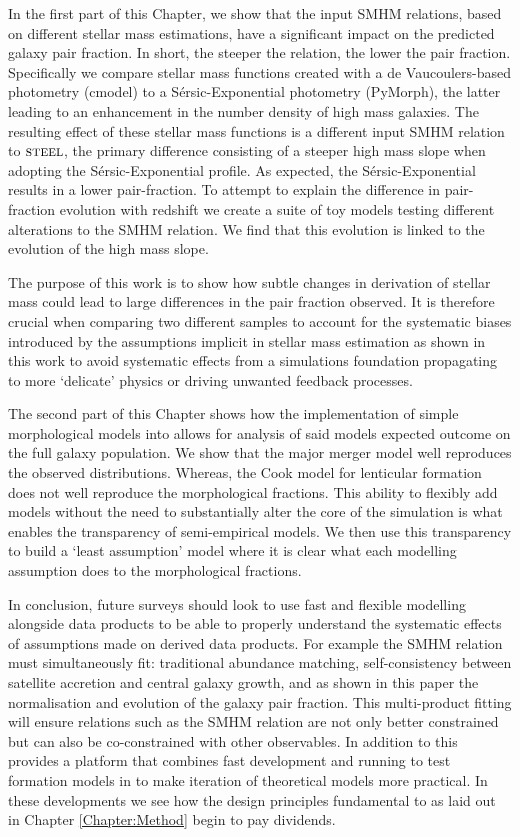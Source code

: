 In the first part of this Chapter, we show that the input SMHM relations, based on different stellar mass estimations, have a significant impact on the predicted galaxy pair fraction. In short, the steeper the relation, the lower the pair fraction. Specifically we compare stellar mass functions created with a de Vaucoulers-based photometry (cmodel) to a S\'ersic-Exponential photometry (PyMorph), the latter leading to an enhancement in the number density of high mass galaxies. The resulting effect of these stellar mass functions is a different input SMHM relation to $\textsc{steel}$, the primary difference consisting of a steeper high mass slope when adopting the S\'ersic-Exponential profile. As expected, the S\'ersic-Exponential results in a lower pair-fraction. To attempt to explain the difference in pair-fraction evolution with redshift we create a suite of toy models testing different alterations to the SMHM relation. We find that this evolution is linked to the evolution of the high mass slope.

The purpose of this work is to show how subtle changes in derivation of stellar mass could lead to large differences in the pair fraction observed. It is therefore crucial when comparing two different samples to account for the systematic biases introduced by the assumptions implicit in stellar mass estimation as shown in this work to avoid systematic effects from a simulations foundation propagating to more `delicate' physics or driving unwanted feedback processes.

The second part of this Chapter shows how the implementation of simple morphological models into \steel allows for analysis of said models expected outcome on the full galaxy population. We show that the major merger model well reproduces the observed distributions. Whereas, the Cook model for lenticular formation does not well reproduce the morphological fractions. This ability to flexibly add models without the need to substantially alter the core of the simulation is what enables the transparency of semi-empirical models. We then use this transparency to build a `least assumption' model where it is clear what each modelling assumption does to the morphological fractions.

In conclusion, future surveys should look to use fast and flexible modelling alongside data products to be able to properly understand the systematic effects of assumptions made on derived data products. For example the SMHM relation must simultaneously fit: traditional abundance matching, self-consistency between satellite accretion and central galaxy growth, and as shown in this paper the normalisation and evolution of the galaxy pair fraction. This multi-product fitting will ensure relations such as the SMHM relation are not only better constrained but can also be co-constrained with other observables. In addition to this \steel provides a platform that combines fast development and running to test formation models in to make iteration of theoretical models more practical. In these developments we see how the design principles fundamental to \steel as laid out in Chapter \ref{Chapter:Method} begin to pay dividends.

